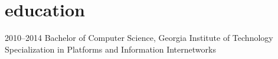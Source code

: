 \documentclass[print]{friggeri-cv} %
\begin{document}

\section{education}

\begin{entrylist}
\entry
{2010--2014}
{Bachelor of Computer Science{\normalfont, Georgia Institute of Technology}}
{}
{Specialization in Platforms and Information Internetworks}

\end{entrylist}





\end{document}
